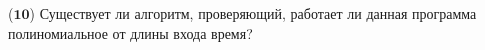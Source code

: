 ($\mathbf{10}$)
Существует ли алгоритм, проверяющий, работает ли данная программа полиномиальное от длины входа время?